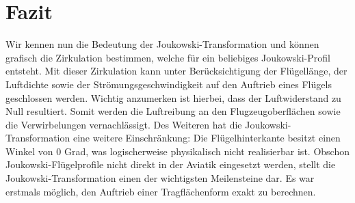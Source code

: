 \section{Fazit}
	Wir kennen nun die Bedeutung der Joukowski-Transformation und können grafisch die Zirkulation bestimmen,
	welche für ein beliebiges Joukowski-Profil entsteht.
	Mit dieser Zirkulation kann unter Berücksichtigung der Flügellänge,
	der Luftdichte sowie der Strömungsgeschwindigkeit auf den Auftrieb eines Flügels geschlossen werden.
	Wichtig anzumerken ist hierbei, dass der Luftwiderstand zu Null resultiert.
	Somit werden die Luftreibung an den Flugzeugoberflächen sowie die Verwirbelungen vernachlässigt.
	Des Weiteren hat die Joukowski-Transformation eine weitere Einschränkung:
	Die Flügelhinterkante besitzt einen Winkel von $0$ Grad, was logischerweise physikalisch nicht realisierbar ist.
	Obschon Joukowski-Flügelprofile nicht direkt in der Aviatik eingesetzt werden,
	stellt die Joukowski-Transformation einen der wichtigsten Meilensteine dar.
	Es war erstmals möglich, den Auftrieb einer Tragflächenform exakt zu berechnen.
